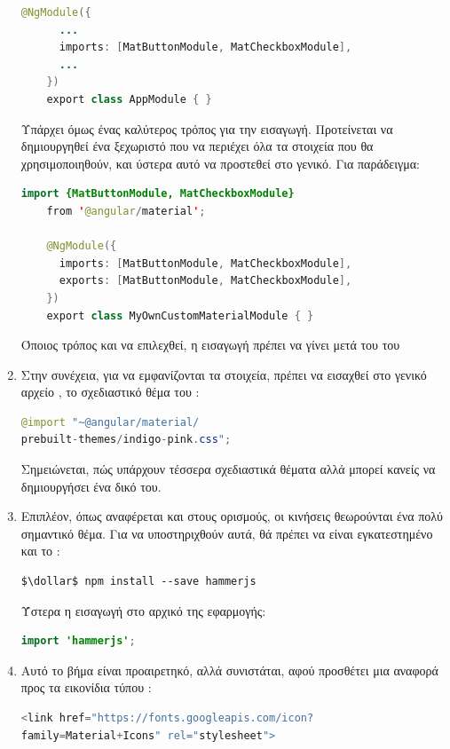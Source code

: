 \begin{enumerate}[label=\textbf{\arabic*}]
\begin{lstlisting}[language=Java]
    @NgModule({
      ...
      imports: [MatButtonModule, MatCheckboxModule],
      ...
    })
    export class AppModule { }
\end{lstlisting}
Υπάρχει όμως ένας καλύτερος τρόπος για την εισαγωγή. Προτείνεται να δημιουργηθεί ένα ξεχωριστό  που να περιέχει όλα τα στοιχεία που θα χρησιμοποιηθούν, και ύστερα αυτό να προστεθεί στο γενικό. Για παράδειγμα:
\begin{lstlisting}[language=Java]
   import {MatButtonModule, MatCheckboxModule} 
    from '@angular/material';

    @NgModule({
      imports: [MatButtonModule, MatCheckboxModule],
      exports: [MatButtonModule, MatCheckboxModule],
    })
    export class MyOwnCustomMaterialModule { }
\end{lstlisting}
Όποιος τρόπος και να επιλεχθεί, η εισαγωγή πρέπει να γίνει μετά του  του 
    \item Στην συνέχεια, για να εμφανίζονται τα στοιχεία, πρέπει να εισαχθεί στο γενικό αρχείο , το σχεδιαστικό θέμα του :
\begin{lstlisting}[language=JAVA]
@import "~@angular/material/
prebuilt-themes/indigo-pink.css";
\end{lstlisting}
Σημειώνεται, πώς υπάρχουν τέσσερα σχεδιαστικά θέματα αλλά μπορεί κανείς να δημιουργήσει ένα δικό του.
    \item Επιπλέον, όπως αναφέρεται και στους ορισμούς, οι κινήσεις θεωρούνται ένα πολύ σημαντικό θέμα. Για να υποστηριχθούν αυτά, θά πρέπει να είναι εγκατεστημένο και το :
\begin{lstlisting}[language=command.com]
   $\dollar$ npm install --save hammerjs
\end{lstlisting}
Ύστερα η εισαγωγή στο αρχικό  της εφαρμογής:
\begin{lstlisting}[language=JAVA]
   import 'hammerjs';
\end{lstlisting}
    \item Αυτό το βήμα είναι προαιρετηκό, αλλά συνιστάται, αφού προσθέτει μια αναφορά προς τα εικονίδια τύπου :
\begin{lstlisting}[language=JAVA]
<link href="https://fonts.googleapis.com/icon?
family=Material+Icons" rel="stylesheet">
\end{lstlisting}
\end{enumerate}

